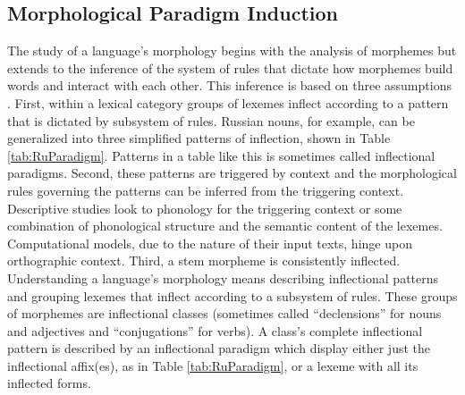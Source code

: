 \documentclass[12pt]{article}
\begin{document}
\subsection{Morphological Paradigm Induction}
\label{paradigms}

The study of a language's morphology begins with the analysis of morphemes but extends to the inference of the system of rules that dictate how morphemes build words and interact with each other. This inference is based on three assumptions \cite{durrett_supervised_2013}. First, within a lexical category groups of lexemes inflect according to a pattern that is dictated by subsystem of rules. Russian nouns, for example, can be generalized into three simplified patterns of inflection, shown in Table \ref{tab:RuParadigm}. Patterns in a table like this is sometimes called inflectional paradigms. Second, these patterns are triggered by context and the morphological rules governing the patterns can be inferred from the triggering context. Descriptive studies look to phonology for the triggering context or some combination of phonological structure and the semantic content of the lexemes. Computational models, due to the nature of their input texts, hinge upon orthographic context. Third, a stem morpheme is consistently inflected. Understanding a language's morphology means describing inflectional patterns and grouping lexemes that inflect according to a subsystem of rules. These groups of morphemes are inflectional classes (sometimes called ``declensions'' for nouns and adjectives and ``conjugations'' for verbs). A class's complete inflectional pattern is described by an inflectional paradigm which display either just the inflectional affix(es), as in Table \ref{tab:RuParadigm}, or a lexeme with all its inflected forms. 
\end{document}
